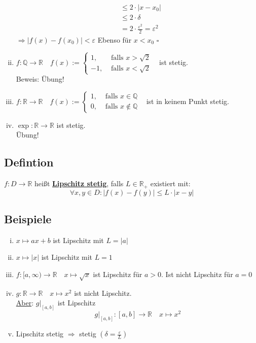 \begin{enumerate}[(i)]
\begin{align*}
		&\le 2 \cdot |x-x_0| \\
		&\le 2 \cdot \delta \\
		&= 2 \cdot \frac{\varepsilon^2}{2} = \varepsilon^2 
	\end{align*}
	$\Rightarrow |f(x)-f(x_0)|< \varepsilon$ Ebenso für $x<x_0$ \hfill \(\square\) 
	\item 
	$f : \mathds{Q} \to \mathds{R}\quad f(x):= 
	\begin{cases}
		1, &\text{ falls }x > \sqrt{2} \\
		-1 , &\text{ falls }x < \sqrt{2} 
	\end{cases} \enspace$ ist stetig.
	\vspace{7pt} \\
	Beweis: Übung!
	\item $f : \mathds{R} \to \mathds{R} \quad f(x):= 
	\begin{cases}
		1, &\text{ falls }x \in \mathds{Q}\\
		0, &\text{ falls }x \not\in \mathds{Q}
		\end{cases} \enspace$ ist in keinem Punkt stetig.
		\item $\exp : \mathds{R} \to \mathds{R}$ ist stetig.
	\vspace{7pt} \\
	Übung!	
\end{enumerate}

\subsection{Defintion} %
\label{sub:defintion}
$f : D \to \mathds{R}$ heißt \underline{\textbf{Lipschitz stetig}}, falls $L \in \mathds{R}_+$ existiert mit:
\[
	\forall x,y \in D : \big| f(x)-f(y) \big| \le L \cdot |x-y|
\]

\subsection{Beispiele} %
\label{sub:beispiele}
\begin{enumerate}[(i)]
	\item $x \mapsto ax+b$ ist Lipschitz mit $L=|a|$
	\item $x \mapsto |x|$ ist Lipschitz mit $L=1$
	\item $f: [a, \infty) \to \mathds{R} \quad x \mapsto \sqrt{x} $
	ist Lipschitz für $a>0$. Ist nicht Lipschitz für $a=0$
	\item $g: \mathds{R} \to \mathds{R} \quad x \mapsto x^2$ ist nicht Lipschitz. \\
	\underline{Aber}: $g|_{[a,b]}$ ist Lipschitz
	\[
		g|_{[a,b]} : [a,b] \to \mathds{R} \quad x \mapsto x^2 \tag{Übung!}
	\]
	\item Lipschitz stetig $\Rightarrow $ stetig $\left(\delta = \frac{\varepsilon}{L} \right)$
\end{enumerate}

